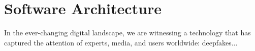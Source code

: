 \documentclass[main.tex]{subfiles}
\begin{document}
\section{Software Architecture}\label{sec:software_architecture}
In the ever-changing digital landscape, we are witnessing a technology that has captured the attention of experts, media, and users worldwide: deepfakes...
\end{document}
